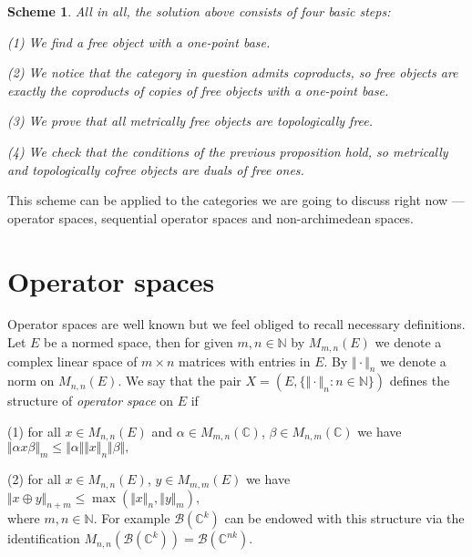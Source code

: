 \documentclass[a0b,landscape]{a0poster}
\newtheorem*{scheme}{Scheme}
\begin{document}
\begin{multicols}{4}
\begin{scheme}
All in all, the solution above consists of four basic steps:

(1) We find a free object with a one-point base.

(2) We notice that the category in question admits coproducts, so free objects
are exactly the coproducts of copies of free objects with a one-point base.

(3) We prove that all metrically free objects are topologically free.

(4) We check that the conditions of the previous proposition hold, so metrically
and topologically cofree objects are duals of free ones.
\end{scheme}

This scheme can be applied to the categories we are going to discuss right now
--- operator spaces, sequential operator spaces and non-archimedean spaces.










\section*{Operator spaces}

Operator spaces are well known but we feel obliged to recall necessary
definitions. Let $E$ be a normed space, then for given $m,n\in\mathbb{N}$ by
$M_{m,n}(E)$ we denote a complex linear space of $m\times n$ matrices with
entries in $E$. By $\Vert\cdot\Vert_n$ we denote a norm on $M_{n,n}(E)$. We say
that the pair $X=(E,\{\Vert\cdot\Vert_n:n\in\mathbb{N}\})$ defines the structure
of \textit{operator space} on $E$ if 

(1) for all $x\in M_{n,n}(E)$ and $\alpha\in M_{m,n}(\mathbb{C})$, $\beta\in
M_{n,m}(\mathbb{C})$ we have
$
\Vert\alpha x\beta\Vert_m\leq\Vert\alpha\Vert\Vert x\Vert_n\Vert\beta\Vert,
$

(2) for all $x\in M_{n,n}(E)$, $y\in M_{m,m}(E)$ we have
$
\Vert x\oplus y\Vert_{n+m}\leq\max(\Vert x\Vert_n,\Vert y\Vert_m),
$\\
where $m,n\in\mathbb{N}$. For example $\mathcal{B}(\mathbb{C}^k)$ can be endowed
with this structure via the identification
$M_{n,n}(\mathcal{B}(\mathbb{C}^k))=\mathcal{B}(\mathbb{C}^{nk})$.


\end{multicols}
\end{document}
